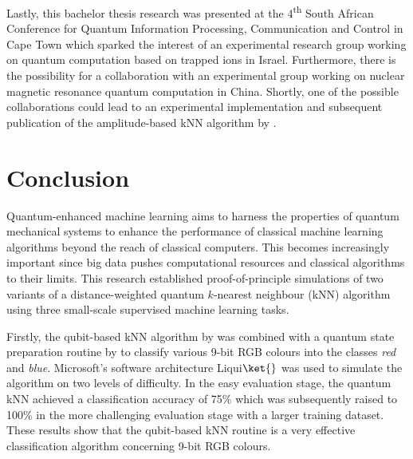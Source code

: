 Lastly, this bachelor thesis research was presented at the 4\textsuperscript{th} South African Conference for Quantum Information Processing, Communication and Control in Cape Town which sparked the interest of an experimental research group working on quantum computation based on trapped ions in Israel. Furthermore, there is the possibility for a collaboration with an experimental group working on nuclear magnetic resonance quantum computation in China. Shortly, one of the possible collaborations could lead to an experimental implementation and subsequent publication of the amplitude-based kNN algorithm by .

\chapter{Conclusion}\label{sec:conclusion}

Quantum-enhanced machine learning aims to harness the properties of quantum mechanical systems to enhance the performance of classical machine learning algorithms beyond the reach of classical computers. This becomes increasingly important since big data pushes computational resources and classical algorithms to their limits. This research established proof-of-principle simulations of two variants of a distance-weighted quantum $k$-nearest neighbour (kNN) algorithm using three small-scale supervised machine learning tasks.

Firstly, the qubit-based kNN algorithm by  was combined with a quantum state preparation routine by  to classify various 9-bit RGB colours into the classes \emph{red} and \emph{blue}. Microsoft's software architecture Liqui$\ket{}$ was used to simulate the algorithm on two levels of difficulty. In the easy evaluation stage, the quantum kNN achieved a classification accuracy of 75\% which was subsequently raised to 100\% in the more challenging evaluation stage with a larger training dataset. These results show that the qubit-based kNN routine is a very effective classification algorithm concerning 9-bit RGB colours.

